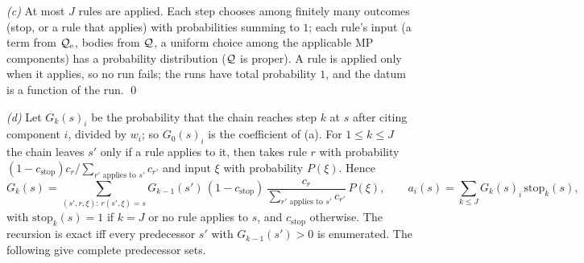 \emph{(c)} At most $J$ rules are applied. Each step chooses among finitely many outcomes (stop, or a rule that applies) with probabilities summing to $1$; each rule's input (a term from $\mathcal{Q}_{\mathrm{e}}$, bodies from $\mathcal{Q}$, a uniform choice among the applicable MP components) has a probability distribution ($\mathcal{Q}$ is proper). A rule is applied only when it applies, so no run fails; the runs have total probability $1$, and the datum is a function of the run. \qed

\emph{(d)} Let $G_k(s)_i$ be the probability that the chain reaches step $k$ at $s$ after citing component $i$, divided by $w_i$; so $G_0(s)_i$ is the \Lzero{} coefficient of (a). For $1\le k\le J$ the chain leaves $s'$ only if a rule applies to it, then takes rule $r$ with probability $(1-c_{\mathrm{stop}})c_r/\sum_{r'\text{ applies to }s'}c_{r'}$ and input $\xi$ with probability $P(\xi)$. Hence
\[
G_k(s)=\sum_{(s',r,\xi):\,r(s',\xi)=s}G_{k-1}(s')\,(1-c_{\mathrm{stop}})\,\frac{c_r}{\sum_{r'\text{ applies to }s'}c_{r'}}\,P(\xi),\qquad a_i(s)=\sum_{k\le J}G_k(s)_i\,\mathrm{stop}_k(s),
\]
with $\mathrm{stop}_k(s)=1$ if $k=J$ or no rule applies to $s$, and $c_{\mathrm{stop}}$ otherwise. The recursion is exact iff every predecessor $s'$ with $G_{k-1}(s')>0$ is enumerated. The following give complete predecessor sets.
